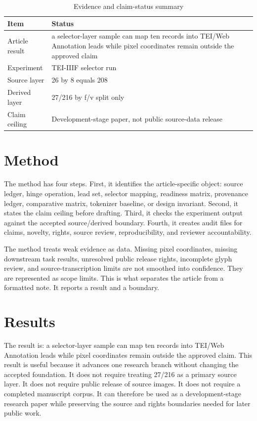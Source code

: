 \documentclass[sigconf,nonacm]{acmart}
\begin{document}
\begin{table}[t]
\caption{Evidence and claim-status summary}
\label{tab:article_na_005}
\begin{tabular}{p{}p{}}
\toprule
Item & Status \\
\midrule
Article result & a selector-layer sample can map ten records into TEI/Web Annotation leads while pixel coordinates remain outside the approved claim \\
Experiment & TEI-IIIF selector run \\
Source layer & 26 by 8 equals 208 \\
Derived layer & 27/216 by f/v split only \\
Claim ceiling & Development-stage paper, not public source-data release \\
\bottomrule
\end{tabular}
\end{table}


\section{Method}
The method has four steps. First, it identifies the article-specific object:
source ledger, hinge operation, lead set, selector mapping, readiness matrix,
provenance ledger, comparative matrix, tokenizer baseline, or design invariant.
Second, it states the claim ceiling before drafting. Third, it checks the
experiment output against the accepted source/derived boundary. Fourth, it
creates audit files for claims, novelty, rights, source review, reproducibility,
and reviewer accountability.

The method treats weak evidence as data. Missing pixel coordinates, missing
downstream task results, unresolved public release rights, incomplete glyph
review, and source-transcription limits are not smoothed into confidence. They
are represented as scope limits. This is what separates the article from a
formatted note. It reports a result and a boundary.

\section{Results}
The result is: a selector-layer sample can map ten records into TEI/Web Annotation leads while pixel coordinates remain outside the approved claim. This result is useful because it advances one research
branch without changing the accepted foundation. It does not require treating
27/216 as a primary source layer. It does not require public release of source
images. It does not require a completed manuscript corpus. It can therefore be
used as a development-stage research paper while preserving the source and rights
boundaries needed for later public work.
\end{document}
